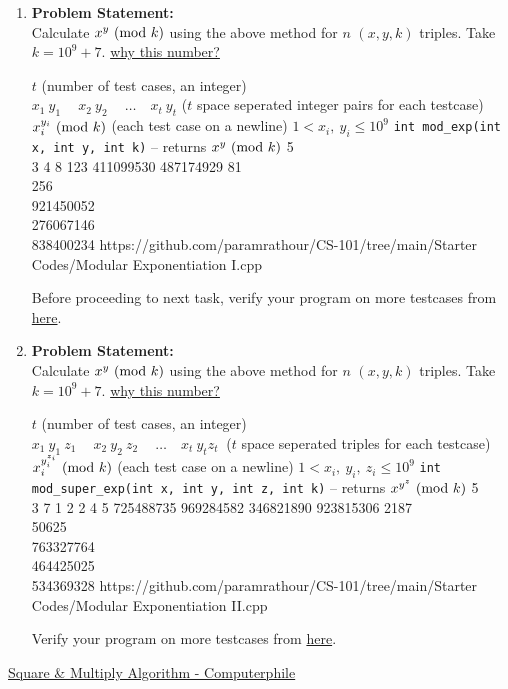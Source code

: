 \begin{enumerate}[label=(\alph*)]
\item 
\textbf{Problem Statement:}\\
Calculate $x^y\ (\mathrm{mod}\ k)$ using the above method for $n$ $(x,y,k)$ triples. Take $k=10^9+7$. \href{https://www.geeksforgeeks.org/modulo-1097-1000000007/}{why this number?}
\begin{testcasesFunction}
	{$t$ \hfill(number of test cases, an integer)\\
	$x_1\ y_1\ \quad x_2\ y_2\ \quad \ldots\quad x_t\ y_t$ \hfill($t$ space seperated integer pairs for each testcase)}
	{$x_i^{y_i} \ (\mathrm{mod}\ k)$ \hfill(each test case on a newline)}
	{$1 < x_i,\ y_i \leq 10^{9}$}
	{\texttt{int mod\_exp(int x, int y, int k)} -- returns $x^y \ (\mathrm{mod}\ k)$}
	{5\\3 4 8 123 411099530 487174929}
	{81\\256\\921450052\\276067146\\838400234}
	{https://github.com/paramrathour/CS-101/tree/main/Starter Codes/Modular Exponentiation I.cpp}
\end{testcasesFunction}
\begin{note}
	Before proceeding to next task, verify your program on more testcases from \href{https://cses.fi/problemset/task/1095}{here}.
\end{note}
\item 
\textbf{Problem Statement:}\\
Calculate $x^y\ (\mathrm{mod}\ k)$ using the above method for $n$ $(x,y,k)$ triples. Take $k=10^9+7$. \href{https://www.geeksforgeeks.org/modulo-1097-1000000007/}{why this number?}
\begin{testcasesFunction}
	{$t$ \hfill(number of test cases, an integer)\\
	$x_1\ y_1\ z_1\ \quad x_2\ y_2\ z_2\ \quad \ldots\quad x_t\ y_t z_t\ $ \hfill($t$ space seperated triples for each testcase)}
	{$x_i^{y_{i}^{z_i}} \ (\mathrm{mod}\ k)$ \hfill(each test case on a newline)}
	{$1 < x_i,\ y_i,\ z_i \leq 10^{9}$}
	{\texttt{int mod\_super\_exp(int x, int y, int z, int k)} -- returns $x^{y^z} \ (\mathrm{mod}\ k)$}
	{5\\3 7 1 2 2 4 5 725488735 969284582 346821890 923815306}
	{2187\\50625\\763327764\\464425025\\534369328}
	{https://github.com/paramrathour/CS-101/tree/main/Starter Codes/Modular Exponentiation II.cpp}
\end{testcasesFunction}
\begin{note}
	Verify your program on more testcases from \href{https://cses.fi/problemset/task/1712}{here}.
\end{note}
\end{enumerate}
\begin{funvideo}
\href{https://youtu.be/cbGB__V8MNk}{Square \& Multiply Algorithm - Computerphile}
\end{funvideo}
\recalctypearea
